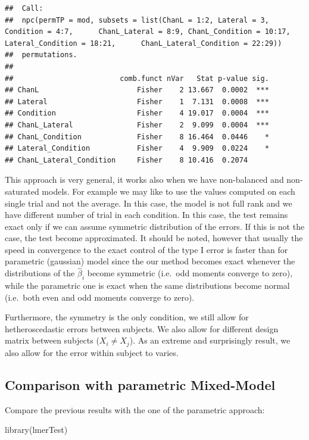\documentclass[
]{article}
\newenvironment{Shaded}{\begin{snugshade}}{\end{snugshade}}
\newcommand{\FunctionTok}[1]{\textcolor[rgb]{0.00,0.00,0.00}{#1}}
\newcommand{\NormalTok}[1]{#1}
\begin{document}
\begin{verbatim}
##  Call:
##  npc(permTP = mod, subsets = list(ChanL = 1:2, Lateral = 3, Condition = 4:7,      ChanL_Lateral = 8:9, ChanL_Condition = 10:17, Lateral_Condition = 18:21,      ChanL_Lateral_Condition = 22:29)) 
##  permutations.
## 
##                         comb.funct nVar   Stat p-value sig.
## ChanL                       Fisher    2 13.667  0.0002  ***
## Lateral                     Fisher    1  7.131  0.0008  ***
## Condition                   Fisher    4 19.017  0.0004  ***
## ChanL_Lateral               Fisher    2  9.099  0.0004  ***
## ChanL_Condition             Fisher    8 16.464  0.0446    *
## Lateral_Condition           Fisher    4  9.909  0.0224    *
## ChanL_Lateral_Condition     Fisher    8 10.416  0.2074
\end{verbatim}

This approach is very general, it works also when we have non-balanced
and non-saturated models. For example we may like to use the values
computed on each single trial and not the average. In this case, the
model is not full rank and we have different number of trial in each
condition. In this case, the test remains exact only if we can assume
symmetric distribution of the errors. If this is not the case, the test
become approximated. It should be noted, however that usually the speed
in convergence to the exact control of the type I error is faster than
for parametric (gaussian) model since the our method becomes exact
whenever the distributions of the \(\hat\beta_i\) become symmetric
(i.e.~odd moments converge to zero), while the parametric one is exact
when the same distributions become normal (i.e.~both even and odd
moments converge to zero).

Furthermore, the symmetry is the only condition, we still allow for
hetheroscedastic errors between subjects. We also allow for different
design matrix between subjects (\(X_i\neq X_j\)). As an extreme and
surprisingly result, we also allow for the error within subject to
varies.

\hypertarget{comparison-with-parametric-mixed-model}{%
\subsection{Comparison with parametric
Mixed-Model}\label{comparison-with-parametric-mixed-model}}

Compare the previous results with the one of the parametric approach:

\begin{Shaded}
\begin{Highlighting}[]
\FunctionTok{library}\NormalTok{(lmerTest)}
\end{Highlighting}
\end{Shaded}
\end{document}
